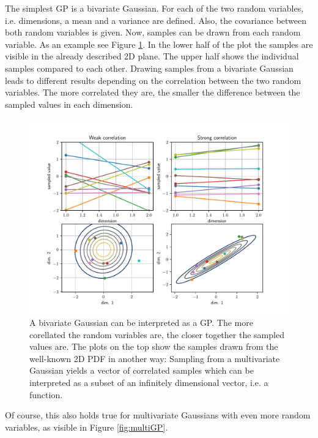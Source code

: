 \documentclass[%
  a4paper,oneside,%
  11pt,%
  smallchapters,
  style=printdev,
  extramargin,
  green,%
  rgb, <cmyk>
  ]{tubsbook}
\begin{document}
The simplest GP is a bivariate Gaussian. For each of the two random variables, i.e. dimensions, a mean and a variance are defined. Also, the covariance between both random variables is given. Now, samples can be drawn from each random variable. As an example see Figure \ref{fig:bivarGP}. In the lower half of the plot the samples are visible in the already described 2D plane. The upper half shows the individual samples compared to each other. Drawing samples from a bivariate Gaussian leads to different results depending on the correlation between the two random variables. The more correlated they are, the smaller the difference between the sampled values in each dimension.
%
\begin{figure}[!ht]
\begin{center}
\includegraphics[width=1\textwidth]{pics/bivarGP}
\caption{A bivariate Gaussian can be interpreted as a GP. The more corellated the random variables are, the closer together the sampled values are. The plots on the top show the samples drawn from the well-known 2D PDF in another way: Sampling from a multivariate Gaussian yields a vector of correlated samples which can be interpreted as a subset of an infinitely dimensional vector, i.e. a function.}
\label{fig:bivarGP}
\end{center}
\end{figure}
%
Of course, this also holds true for multivariate Gaussians with even more random variables, as visible in Figure \ref{fig:multiGP}.
\end{document}
